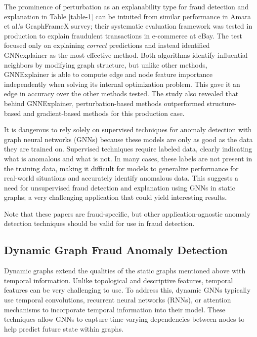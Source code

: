 The prominence of perturbation as an explanability type for fraud detection and explanation in Table \ref{table-1} can be intuited from similar performance in Amara et al.\cite{amara_graphframex_2022}'s GraphFrameX survey; their systematic evaluation framework was tested in production to explain fraudulent transactions in e-commerce at eBay. The test focused only on explaining \textit{correct} predictions and instead identified GNNexplainer as the most effective method. Both algorithms identify influential neighbors by modifying graph structure, but unlike other methods, GNNExplainer is able to compute edge and node feature importance independently when solving its internal optimization problem. This gave it an edge in accuracy over the other methods tested. The study also revealed that behind GNNExplainer, perturbation-based methods outperformed structure-based and gradient-based methods for this production case. 

It is dangerous to rely solely on supervised techniques for anomaly detection with graph neural networks (GNNs) because these models are only as good as the data they are trained on. Supervised techniques require labeled data, clearly indicating what is anomalous and what is not. In many cases, these labels are not present in the training data, making it difficult for models to generalize performance for real-world situations and accurately identify anomalous data. This suggests a need for unsupervised fraud detection and explanation using GNNs in static graphs; a very challenging application that could yield interesting results.

Note that these papers are fraud-specific, but other application-agnostic anomaly detection techniques should be valid for use in fraud detection.

\subsection{Dynamic Graph Fraud Anomaly Detection}
Dynamic graphs extend the qualities of the static graphs mentioned above with temporal information. Unlike topological and descriptive features, temporal features can be very challenging to use. To address this, dynamic GNNs typically use temporal convolutions, recurrent neural networks (RNNs), or attention mechanisms to incorporate temporal information into their model\cite{ma_comprehensive_2021}. These techniques allow GNNs to capture time-varying dependencies between nodes to help predict future state within graphs.

